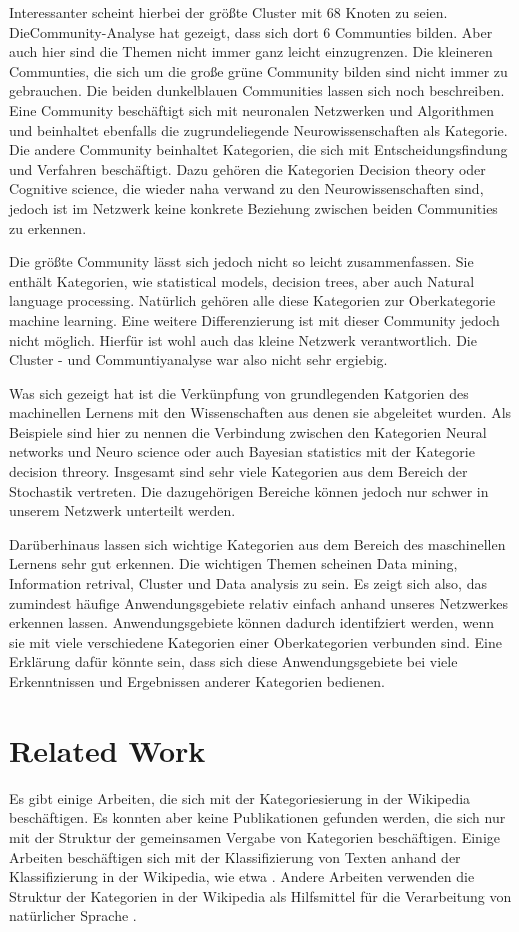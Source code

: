 \documentclass{acm_proc_article-sp}
\begin{document}
Interessanter scheint hierbei der größte Cluster mit 68 Knoten zu seien. DieCommunity-Analyse hat gezeigt, dass sich dort 6 Communties bilden. Aber auch hier sind die Themen nicht immer ganz leicht einzugrenzen. Die kleineren Communties, die sich um die große grüne Community bilden sind nicht immer zu gebrauchen. Die beiden dunkelblauen Communities lassen sich noch beschreiben.
Eine Community beschäftigt sich mit neuronalen Netzwerken und Algorithmen und beinhaltet ebenfalls die zugrundeliegende Neurowissenschaften als Kategorie. Die andere Community beinhaltet Kategorien, die sich mit Entscheidungsfindung und Verfahren beschäftigt. Dazu gehören die Kategorien Decision theory oder Cognitive science, die wieder naha verwand zu den Neurowissenschaften sind, jedoch ist im Netzwerk keine konkrete Beziehung zwischen beiden Communities zu erkennen.

Die größte Community lässt sich jedoch nicht so leicht zusammenfassen. Sie enthält Kategorien, wie statistical models, decision trees, aber auch Natural language processing. Natürlich gehören alle diese Kategorien zur Oberkategorie machine learning. Eine weitere Differenzierung ist mit dieser Community jedoch nicht möglich. Hierfür ist wohl auch das kleine Netzwerk verantwortlich. Die Cluster - und Communtiyanalyse war also nicht sehr ergiebig.

Was sich gezeigt hat ist die Verkünpfung von grundlegenden Katgorien des machinellen Lernens mit den Wissenschaften aus denen sie abgeleitet wurden. Als Beispiele sind hier zu nennen die Verbindung zwischen den Kategorien Neural networks und Neuro science oder auch Bayesian statistics mit der Kategorie decision threory. Insgesamt sind sehr viele Kategorien aus dem Bereich der Stochastik vertreten. Die dazugehörigen Bereiche können jedoch nur schwer in unserem Netzwerk unterteilt werden.

Darüberhinaus lassen sich wichtige Kategorien aus dem Bereich des maschinellen Lernens sehr gut erkennen. Die wichtigen Themen scheinen Data mining, Information retrival, Cluster und Data analysis zu sein. Es zeigt sich also, das zumindest häufige Anwendungsgebiete relativ einfach anhand unseres Netzwerkes erkennen lassen. Anwendungsgebiete können dadurch identifziert werden, wenn sie mit viele verschiedene Kategorien einer Oberkategorien verbunden sind. Eine Erklärung dafür könnte sein, dass sich diese Anwendungsgebiete bei viele Erkenntnissen und Ergebnissen anderer Kategorien bedienen. 

\section{Related Work}
Es gibt einige Arbeiten, die sich mit der Kategoriesierung in der Wikipedia beschäftigen. Es konnten aber keine Publikationen gefunden werden, die sich nur mit der Struktur der gemeinsamen Vergabe von Kategorien beschäftigen. Einige Arbeiten beschäftigen sich mit der Klassifizierung von Texten anhand der Klassifizierung in der Wikipedia, wie etwa \cite{Weale_utilizingwikipedia}. Andere Arbeiten verwenden die Struktur der Kategorien in der Wikipedia als Hilfsmittel für die Verarbeitung von natürlicher Sprache \cite{tubiblio32662}.
\end{document}
